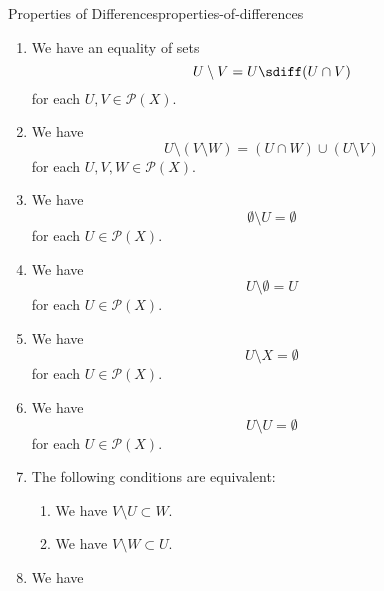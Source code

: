 \begin{proposition}{Properties of Differences}{properties-of-differences}
\begin{enumerate}
        \item\label{properties-of-differences-interaction-with-symmetric-differences}We have an equality of sets
            \[
                U\setminus V%
                =%
                U\sdiff(U\cap V)%
            \]%
            for each $U,V\in\mathcal{P}(X)$.
        \item\label{properties-of-differences-triple-differences}We have
            \[
                U\setminus(V\setminus W)%
                =%
                (U\cap W)\cup(U\setminus V)%
            \]%
            for each $U,V,W\in\mathcal{P}(X)$.
        \item\label{properties-of-differences-left-annihilation}We have
            \[
                \emptyset\setminus U%
                =%
                \emptyset%
            \]%
            for each $U\in\mathcal{P}(X)$.
        \item\label{properties-of-differences-right-unitality}We have
            \[
                U\setminus\emptyset%
                =%
                U%
            \]%
            for each $U\in\mathcal{P}(X)$.
        \item\label{properties-of-differences-right-annihilation}We have
            \[
                U\setminus X%
                =%
                \emptyset%
            \]%
            for each $U\in\mathcal{P}(X)$.
        \item\label{properties-of-differences-invertibility}We have
            \[
                U\setminus U
                =
                \emptyset
            \]%
            for each $U\in\mathcal{P}(X)$.
        \item\label{properties-of-differences-interaction-with-containment}The following conditions are equivalent:
            \begin{enumerate}
                \item\label{properties-of-differences-interaction-with-containment-a}We have $V\setminus U\subset W$.
                \item\label{properties-of-differences-interaction-with-containment-b}We have $V\setminus W\subset U$.
            \end{enumerate}
        \item\label{properties-of-differences-interaction-with-characteristic-functions}We have

\end{enumerate}
\end{proposition}
